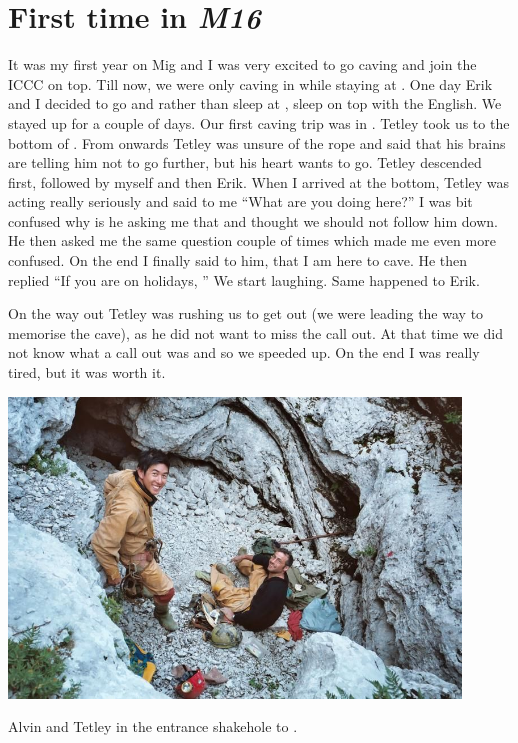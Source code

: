 \section{\texorpdfstring{First time in
\emph{M16}}{First time in M16}}


It was my first year on Mig and I was very excited to go caving and join
the ICCC on top. Till now, we were only caving in  while
staying at . One day Erik and I decided to go and rather than sleep
at , sleep on top with the English. We stayed up for a couple of
days. Our first caving trip was in . Tetley took us to the
bottom of . From  onwards Tetley was unsure of the rope and
said that his brains are telling him not to go further, but his heart
wants to go. Tetley descended  first, followed by myself and then
Erik. When I arrived at the bottom, Tetley was acting really seriously
and said to me ``What are you doing here?'' I was bit confused why is he
asking me that and thought we should not follow him down. He then asked
me the same question couple of times which made me even more confused.
On the end I finally said to him, that I am here to cave. He then
replied ``If you are on holidays, '' We start laughing. Same happened to Erik.

On the way out Tetley was rushing us to get out (we were leading the way
to memorise the cave), as he did not want to miss the call out. At that
time we did not know what a call out was and so we speeded up. On the
end I was really tired, but it was worth it.


\begin{pagefigure}
\checkoddpage \ifoddpage \forcerectofloat \else \forceversofloat \fi
   \centering
\includegraphics[width = 0.9\textwidth]{2007/m16/jarvist frost gr1 film1 -004_1--orig.jpg}
\caption{Alvin and Tetley in the entrance shakehole to \protect{}. }
\end{pagefigure}
